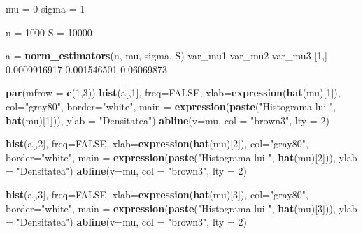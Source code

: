 \documentclass[
]{article}
\newenvironment{Shaded}{\begin{snugshade}}{\end{snugshade}}
\newcommand{\DataTypeTok}[1]{\textcolor[rgb]{0.13,0.29,0.53}{#1}}
\newcommand{\DecValTok}[1]{\textcolor[rgb]{0.00,0.00,0.81}{#1}}
\newcommand{\FloatTok}[1]{\textcolor[rgb]{0.00,0.00,0.81}{#1}}
\newcommand{\KeywordTok}[1]{\textcolor[rgb]{0.13,0.29,0.53}{\textbf{#1}}}
\newcommand{\NormalTok}[1]{#1}
\newcommand{\OtherTok}[1]{\textcolor[rgb]{0.56,0.35,0.01}{#1}}
\newcommand{\StringTok}[1]{\textcolor[rgb]{0.31,0.60,0.02}{#1}}
\begin{document}
\begin{Shaded}
\begin{Highlighting}[]
\NormalTok{mu =}\StringTok{ }\DecValTok{0}
\NormalTok{sigma =}\StringTok{ }\DecValTok{1}

\NormalTok{n =}\StringTok{ }\DecValTok{1000}
\NormalTok{S =}\StringTok{ }\DecValTok{10000}

\NormalTok{a =}\StringTok{ }\KeywordTok{norm_estimators}\NormalTok{(n, mu, sigma, S)}
\NormalTok{          var_mu1     var_mu2    var_mu3}
\NormalTok{[}\DecValTok{1}\NormalTok{,] }\FloatTok{0.0009916917} \FloatTok{0.001546501} \FloatTok{0.06069873}

\KeywordTok{par}\NormalTok{(}\DataTypeTok{mfrow =} \KeywordTok{c}\NormalTok{(}\DecValTok{1}\NormalTok{,}\DecValTok{3}\NormalTok{))}
\KeywordTok{hist}\NormalTok{(a[,}\DecValTok{1}\NormalTok{], }\DataTypeTok{freq=}\OtherTok{FALSE}\NormalTok{, }\DataTypeTok{xlab=}\KeywordTok{expression}\NormalTok{(}\KeywordTok{hat}\NormalTok{(mu)[}\DecValTok{1}\NormalTok{]), }
     \DataTypeTok{col=}\StringTok{"gray80"}\NormalTok{, }\DataTypeTok{border=}\StringTok{"white"}\NormalTok{, }
     \DataTypeTok{main =} \KeywordTok{expression}\NormalTok{(}\KeywordTok{paste}\NormalTok{(}\StringTok{"Histograma lui "}\NormalTok{, }\KeywordTok{hat}\NormalTok{(mu)[}\DecValTok{1}\NormalTok{])),}
     \DataTypeTok{ylab =} \StringTok{"Densitatea"}\NormalTok{)}
\KeywordTok{abline}\NormalTok{(}\DataTypeTok{v=}\NormalTok{mu, }\DataTypeTok{col =} \StringTok{"brown3"}\NormalTok{, }\DataTypeTok{lty =} \DecValTok{2}\NormalTok{)}

\KeywordTok{hist}\NormalTok{(a[,}\DecValTok{2}\NormalTok{], }\DataTypeTok{freq=}\OtherTok{FALSE}\NormalTok{, }\DataTypeTok{xlab=}\KeywordTok{expression}\NormalTok{(}\KeywordTok{hat}\NormalTok{(mu)[}\DecValTok{2}\NormalTok{]), }
     \DataTypeTok{col=}\StringTok{"gray80"}\NormalTok{, }\DataTypeTok{border=}\StringTok{"white"}\NormalTok{,}
     \DataTypeTok{main =} \KeywordTok{expression}\NormalTok{(}\KeywordTok{paste}\NormalTok{(}\StringTok{"Histograma lui "}\NormalTok{, }\KeywordTok{hat}\NormalTok{(mu)[}\DecValTok{2}\NormalTok{])),}
     \DataTypeTok{ylab =} \StringTok{"Densitatea"}\NormalTok{)}
\KeywordTok{abline}\NormalTok{(}\DataTypeTok{v=}\NormalTok{mu, }\DataTypeTok{col =} \StringTok{"brown3"}\NormalTok{, }\DataTypeTok{lty =} \DecValTok{2}\NormalTok{)}

\KeywordTok{hist}\NormalTok{(a[,}\DecValTok{3}\NormalTok{], }\DataTypeTok{freq=}\OtherTok{FALSE}\NormalTok{, }\DataTypeTok{xlab=}\KeywordTok{expression}\NormalTok{(}\KeywordTok{hat}\NormalTok{(mu)[}\DecValTok{3}\NormalTok{]), }
     \DataTypeTok{col=}\StringTok{"gray80"}\NormalTok{, }\DataTypeTok{border=}\StringTok{"white"}\NormalTok{,}
     \DataTypeTok{main =} \KeywordTok{expression}\NormalTok{(}\KeywordTok{paste}\NormalTok{(}\StringTok{"Histograma lui "}\NormalTok{, }\KeywordTok{hat}\NormalTok{(mu)[}\DecValTok{3}\NormalTok{])),}
     \DataTypeTok{ylab =} \StringTok{"Densitatea"}\NormalTok{)}
\KeywordTok{abline}\NormalTok{(}\DataTypeTok{v=}\NormalTok{mu, }\DataTypeTok{col =} \StringTok{"brown3"}\NormalTok{, }\DataTypeTok{lty =} \DecValTok{2}\NormalTok{)}
\end{Highlighting}
\end{Shaded}
\end{document}
